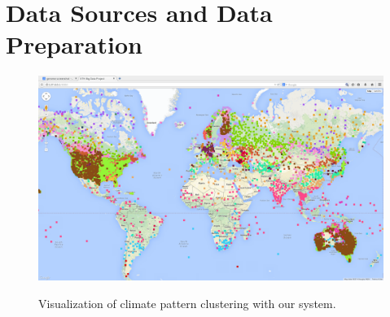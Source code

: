 \section{Data Sources and Data Preparation}

\begin{figure} 
\centering
\includegraphics[width=.85\linewidth]{./figure/Full_view.png}
	\label{fig:FullView}
	\caption{Visualization of climate pattern clustering with our system.}
\end{figure}
